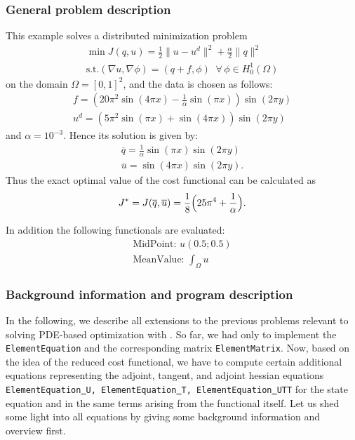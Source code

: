 \subsubsection{General problem description}
This example solves a distributed minimization problem
\begin{gather*}
\min J(q,u) = \frac{1}{2} \|u-u^d\|^2 + \frac{\alpha}{2}\|q\|^2\\
\text{s.t.} (\nabla u,\nabla \phi) = (q+f,\phi)\;\;\forall\,\phi \in H^1_0(\Omega)
\end{gather*}
on the domain $\Omega = [0,1]^2$, and the data is chosen as follows:
\begin{gather*}
 f = \left(20\pi^2  \sin(4 \pi x) - \frac{1}{\alpha}  \sin(\pi x)\right) \sin(2 \pi y)\\
 u^d = \left( 5 \pi^2 \sin(\pi x) + \sin(4 \pi x)\right)  \sin(2\pi y)
\end{gather*}
and $\alpha = 10^{-3}$.
Hence its solution is given by:
\begin{gather*}
 \overline{q} = \frac{1}{\alpha} \sin(\pi x) \sin(2 \pi y)\\
 \overline{u} = \sin(4 \pi x) \sin(2 \pi y).
\end{gather*}
Thus the exact optimal value of the cost functional can be calculated as 
\begin{gather*}
 J^* = J(\overline{q},\overline{u}) = \frac{1}{8}\Bigl(25\pi^4 + \frac{1}{\alpha}\Bigr).
\end{gather*}

In addition the following functionals are evaluated:
\begin{gather*}
  \text{MidPoint: } u(0.5 ; 0.5)\\[2mm]
  \text{MeanValue: }\int_\Omega u
\end{gather*}

\subsubsection{Background information and program description}
In the following, we describe all extensions to the previous problems 
relevant to solving PDE-based optimization with \dope{}. So far, 
we had only to implement the \texttt{ElementEquation} and the corresponding
matrix \texttt{ElementMatrix}. Now, based on the idea of the reduced cost
functional, we have to compute certain additional equations representing the 
adjoint, tangent, and adjoint hessian equations
\texttt{ElementEquation\underline{ }U, ElementEquation\underline{ }T,
ElementEquation\underline{ }UTT}
for the state equation and in the same terms arising from the functional
itself. Let us shed some light into all equations by giving some background
information and overview first.

